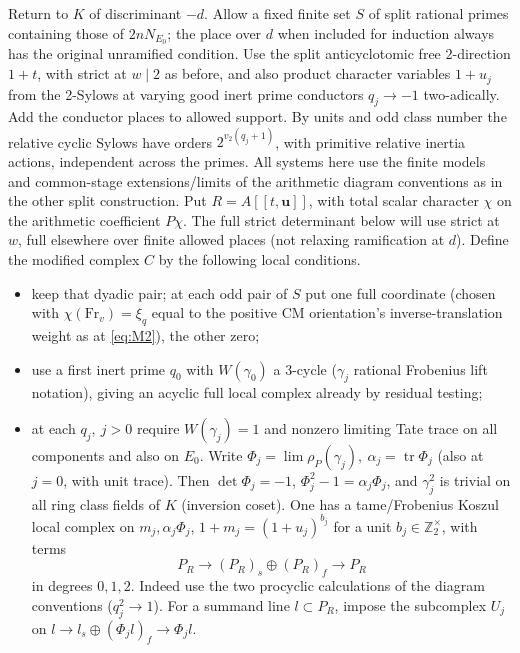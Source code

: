 Return to \(K\) of discriminant \(-d\). Allow a fixed finite set \(S\) of split rational primes containing those of \(2nN_{E_0}\); the place over \(d\) when included for induction always has the original unramified condition. Use the split anticyclotomic free \(2\)-direction \(1+t\), with strict at \(w\mid2\) as before, and also product character variables \(1+u_j\) from the 2-Sylows at varying good inert prime conductors \(q_j\to-1\) two-adically. Add the conductor places to allowed support. By units and odd class number the relative cyclic Sylows have orders \(2^{v_2(q_j+1)}\), with primitive relative inertia actions, independent across the primes. All systems here use the finite models and common-stage extensions/limits of the arithmetic diagram conventions as in the other split construction. Put \(R=A[[t,\mathbf u]]\), with total scalar character \(\chi\) on the arithmetic coefficient \(P\chi\). The full strict determinant below will use strict at \(w\), full elsewhere over finite allowed places (not relaxing ramification at \(d\)). Define the modified complex \(C\) by the following local conditions.
\begin{itemize}
\item keep that dyadic pair; at each odd pair of \(S\) put one full coordinate (chosen with \(\chi(\mathrm{Fr}_v)=\xi_q\) equal to the positive CM orientation's inverse-translation weight as at \eqref{eq:M2}), the other zero;
\item use a first inert prime \(q_0\) with \(W(\gamma_0)\) a 3-cycle (\(\gamma_j\) rational Frobenius lift notation), giving an acyclic full local complex already by residual testing;
\item at each \(q_j,\ j>0\) require \(W(\gamma_j)=1\) and nonzero limiting Tate trace on all components and also on \(E_0\). Write \(\Phi_j=\lim\rho_P(\gamma_j),\ \alpha_j=\operatorname{tr}\Phi_j\) (also at \(j=0\), with unit trace). Then \(\det\Phi_j=-1\), \(\Phi_j^2-1=\alpha_j\Phi_j\), and \(\gamma_j^2\) is trivial on all ring class fields of \(K\) (inversion coset). One has a tame/Frobenius Koszul local complex on \(m_j,\alpha_j\Phi_j\), \(1+m_j=(1+u_j)^{b_j}\) for a unit \(b_j\in\mathbb Z_2^\times\), with terms
\[
                  P_R\longrightarrow (P_R)_s\oplus(P_R)_f
                      \longrightarrow P_R
\]
in degrees \(0,1,2\). Indeed use the two procyclic calculations of the diagram conventions (\(q_j^2\to1\)). For a summand line \(l\subset P_R\), impose the subcomplex \(U_j\) on \(l\to l_s\oplus(\Phi_j l)_f\to\Phi_j l\).
\end{itemize}

